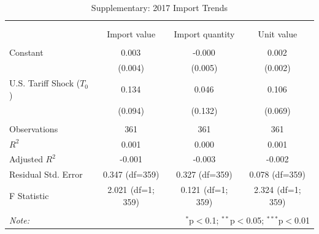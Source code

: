 \begin{table}[!htbp] \centering
  \caption{Supplementary: 2017 Import Trends}
  \label{tab:supp_trade_pretrends_2017}
\begin{tabular}{@{\extracolsep{5pt}}lccc}
\\[-1.8ex]\hline
\hline \\[-1.8ex]
\\[-1.8ex] & \multicolumn{1}{c}{Import value} & \multicolumn{1}{c}{Import quantity} & \multicolumn{1}{c}{Unit value}  \\
\hline \\[-1.8ex]
 Constant & 0.003$^{}$ & -0.000$^{}$ & 0.002$^{}$ \\
& (0.004) & (0.005) & (0.002) \\
 U.S. Tariff Shock ($T_0$) & 0.134$^{}$ & 0.046$^{}$ & 0.106$^{}$ \\
& (0.094) & (0.132) & (0.069) \\
\hline \\[-1.8ex]
 Observations & 361 & 361 & 361 \\
 $R^2$ & 0.001 & 0.000 & 0.001 \\
 Adjusted $R^2$ & -0.001 & -0.003 & -0.002 \\
 Residual Std. Error & 0.347 (df=359) & 0.327 (df=359) & 0.078 (df=359) \\
 F Statistic & 2.021$^{}$ (df=1; 359) & 0.121$^{}$ (df=1; 359) & 2.324$^{}$ (df=1; 359) \\
\hline
\hline \\[-1.8ex]
\textit{Note:} & \multicolumn{3}{r}{$^{*}$p$<$0.1; $^{**}$p$<$0.05; $^{***}$p$<$0.01} \\
\end{tabular}
\end{table}